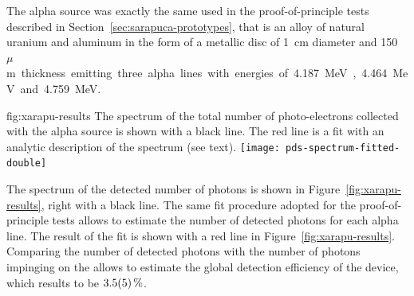 The alpha source was exactly the same used in the  proof-of-principle tests described in Section~\ref{sec:sarapuca-prototypes}, that is an alloy of natural uranium and aluminum in the form of a metallic disc of \SI{1}{cm} diameter and \SI{150}{$\mu$m} thickness emitting three alpha lines with energies of  \SI{4.187}{MeV}, \SI{4.464}{MeV} and  \SI{4.759}{MeV}. 

\begin{dunefigure}{fig:xarapu-results}
{The  spectrum of the total number of photo-electrons collected with the alpha source is shown with a black line. The red line is a fit with an analytic description of the spectrum (see text).} 
	\texttt{[image: pds-spectrum-fitted-double]}
\end{dunefigure}  


The spectrum of the detected number of photons is shown in Figure~\ref{fig:xarapu-results}, right with a black line. The same fit procedure adopted for the  proof-of-principle tests allows to estimate the number of detected photons for each alpha line. The result of the fit is shown with a red line in Figure~\ref{fig:xarapu-results}. Comparing the number of detected photons with the number of photons impinging on the  allows to estimate the global detection efficiency of the device, which results to be $\SI{3.5\pm0.5}{\%}$.


